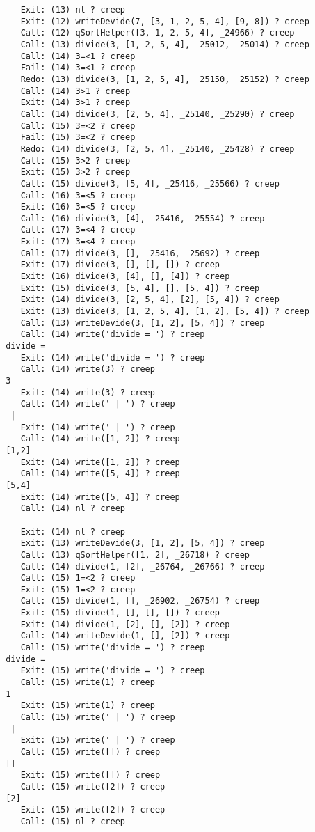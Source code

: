 \documentclass{article}
\begin{document}
\begin{lstlisting}
	Exit: (13) nl ? creep
	Exit: (12) writeDevide(7, [3, 1, 2, 5, 4], [9, 8]) ? creep
	Call: (12) qSortHelper([3, 1, 2, 5, 4], _24966) ? creep
	Call: (13) divide(3, [1, 2, 5, 4], _25012, _25014) ? creep
	Call: (14) 3=<1 ? creep
	Fail: (14) 3=<1 ? creep
	Redo: (13) divide(3, [1, 2, 5, 4], _25150, _25152) ? creep
	Call: (14) 3>1 ? creep
	Exit: (14) 3>1 ? creep
	Call: (14) divide(3, [2, 5, 4], _25140, _25290) ? creep
	Call: (15) 3=<2 ? creep
	Fail: (15) 3=<2 ? creep
	Redo: (14) divide(3, [2, 5, 4], _25140, _25428) ? creep
	Call: (15) 3>2 ? creep
	Exit: (15) 3>2 ? creep
	Call: (15) divide(3, [5, 4], _25416, _25566) ? creep
	Call: (16) 3=<5 ? creep
	Exit: (16) 3=<5 ? creep
	Call: (16) divide(3, [4], _25416, _25554) ? creep
	Call: (17) 3=<4 ? creep
	Exit: (17) 3=<4 ? creep
	Call: (17) divide(3, [], _25416, _25692) ? creep
	Exit: (17) divide(3, [], [], []) ? creep
	Exit: (16) divide(3, [4], [], [4]) ? creep
	Exit: (15) divide(3, [5, 4], [], [5, 4]) ? creep
	Exit: (14) divide(3, [2, 5, 4], [2], [5, 4]) ? creep
	Exit: (13) divide(3, [1, 2, 5, 4], [1, 2], [5, 4]) ? creep
	Call: (13) writeDevide(3, [1, 2], [5, 4]) ? creep
	Call: (14) write('divide = ') ? creep
 divide =
	Exit: (14) write('divide = ') ? creep
	Call: (14) write(3) ? creep
 3
	Exit: (14) write(3) ? creep
	Call: (14) write(' | ') ? creep
  |
	Exit: (14) write(' | ') ? creep
	Call: (14) write([1, 2]) ? creep
 [1,2]
	Exit: (14) write([1, 2]) ? creep
	Call: (14) write([5, 4]) ? creep
 [5,4]
	Exit: (14) write([5, 4]) ? creep
	Call: (14) nl ? creep
 
	Exit: (14) nl ? creep
	Exit: (13) writeDevide(3, [1, 2], [5, 4]) ? creep
	Call: (13) qSortHelper([1, 2], _26718) ? creep
	Call: (14) divide(1, [2], _26764, _26766) ? creep
	Call: (15) 1=<2 ? creep
	Exit: (15) 1=<2 ? creep
	Call: (15) divide(1, [], _26902, _26754) ? creep
	Exit: (15) divide(1, [], [], []) ? creep
	Exit: (14) divide(1, [2], [], [2]) ? creep
	Call: (14) writeDevide(1, [], [2]) ? creep
	Call: (15) write('divide = ') ? creep
 divide =
	Exit: (15) write('divide = ') ? creep
	Call: (15) write(1) ? creep
 1
	Exit: (15) write(1) ? creep
	Call: (15) write(' | ') ? creep
  |
	Exit: (15) write(' | ') ? creep
	Call: (15) write([]) ? creep
 []
	Exit: (15) write([]) ? creep
	Call: (15) write([2]) ? creep
 [2]
	Exit: (15) write([2]) ? creep
	Call: (15) nl ? creep
 

\end{lstlisting}
\end{document}
